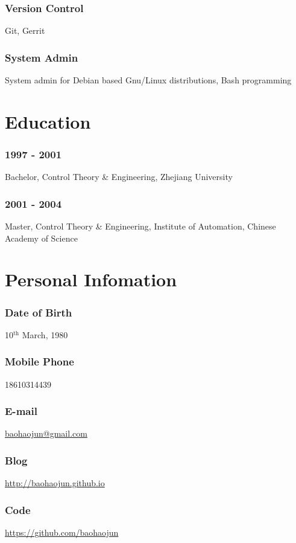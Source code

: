 \documentclass[11pt,dvipdfmx,CJKbookmarks]{article}
\begin{document}
\begin{CJK*}{UTF8}{simsun}
\subsubsection{Version Control}
\label{sec-3-0-3}
Git, Gerrit
\subsubsection{System Admin}
\label{sec-3-0-4}
System admin for Debian based Gnu/Linux distributions, Bash
programming

\section{Education}
\label{sec-4}

\subsubsection{1997 - 2001}
\label{sec-4-0-1}
Bachelor, Control Theory \& Engineering, Zhejiang University
\subsubsection{2001 - 2004}
\label{sec-4-0-2}
Master, Control Theory \& Engineering, Institute of Automation,
Chinese Academy of Science

\section{Personal Infomation}
\label{sec-5}
\subsubsection{Date of Birth}
\label{sec-5-0-1}
10$^{\text{th}}$ March, 1980
\subsubsection{Mobile Phone}
\label{sec-5-0-2}
18610314439
\subsubsection{E-mail}
\label{sec-5-0-3}
\href{mailto:baohaojun@gmail.com}{baohaojun@gmail.com}
\subsubsection{Blog}
\label{sec-5-0-4}
\url{http://baohaojun.github.io}
\subsubsection{Code}
\label{sec-5-0-5}
\url{https://github.com/baohaojun}


\end{CJK*}
\end{document}
